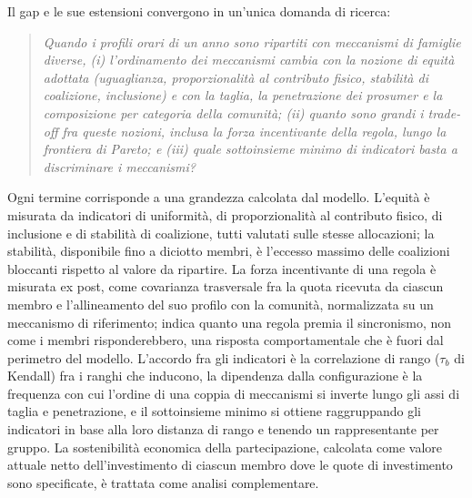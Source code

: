 Il gap e le sue estensioni convergono in un'unica domanda di ricerca:

\begin{quote}
\emph{Quando i profili orari di un anno sono ripartiti con meccanismi di famiglie diverse, (i) l'ordinamento dei meccanismi cambia con la nozione di equità adottata (uguaglianza, proporzionalità al contributo fisico, stabilità di coalizione, inclusione) e con la taglia, la penetrazione dei prosumer e la composizione per categoria della comunità; (ii) quanto sono grandi i trade-off fra queste nozioni, inclusa la forza incentivante della regola, lungo la frontiera di Pareto; e (iii) quale sottoinsieme minimo di indicatori basta a discriminare i meccanismi?}
\end{quote}

Ogni termine corrisponde a una grandezza calcolata dal modello. L'equità è misurata da indicatori di uniformità, di proporzionalità al contributo fisico, di inclusione e di stabilità di coalizione, tutti valutati sulle stesse allocazioni; la stabilità, disponibile fino a diciotto membri, è l'eccesso massimo delle coalizioni bloccanti rispetto al valore da ripartire. La forza incentivante di una regola è misurata ex post, come covarianza trasversale fra la quota ricevuta da ciascun membro e l'allineamento del suo profilo con la comunità, normalizzata su un meccanismo di riferimento; indica quanto una regola premia il sincronismo, non come i membri risponderebbero, una risposta comportamentale che è fuori dal perimetro del modello. L'accordo fra gli indicatori è la correlazione di rango (\(\tau_b\) di Kendall) fra i ranghi che inducono, la dipendenza dalla configurazione è la frequenza con cui l'ordine di una coppia di meccanismi si inverte lungo gli assi di taglia e penetrazione, e il sottoinsieme minimo si ottiene raggruppando gli indicatori in base alla loro distanza di rango e tenendo un rappresentante per gruppo. La sostenibilità economica della partecipazione, calcolata come valore attuale netto dell'investimento di ciascun membro dove le quote di investimento sono specificate, è trattata come analisi complementare.

